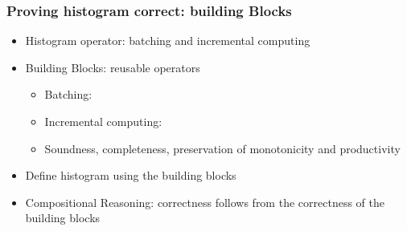 \documentclass[aspectratio=169,10pt]{beamer}
\begin{document}
\begin{frame}[fragile]
  \frametitle{Proving histogram correct: building Blocks}
  \begin{itemize}
    \item Histogram operator: batching and incremental computing
    \item Building Blocks: reusable operators
          \begin{itemize}
            \item Batching: 
            \item Incremental computing: 
            \item Soundness, completeness, preservation of monotonicity and productivity
          \end{itemize}
  \pause
          \item Define histogram using the building blocks
          \item Compositional Reasoning: correctness follows from the correctness of the building blocks
  \end{itemize}
\end{frame}


\end{document}
